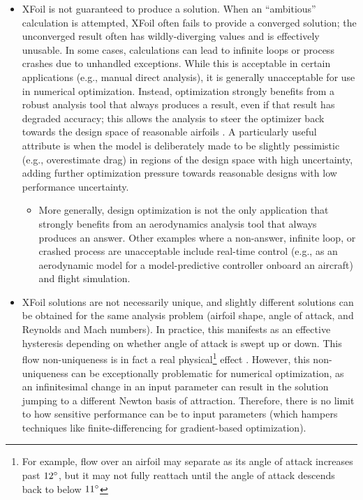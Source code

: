 \documentclass[conf]{new-aiaa}
\begin{document}
    \begin{itemize}
        \item XFoil is not guaranteed to produce a solution. When an ``ambitious'' calculation is attempted, XFoil often fails to provide a converged solution; the unconverged result often has wildly-diverging values and is effectively unusable. In some cases, calculations can lead to infinite loops or process crashes due to unhandled exceptions. While this is acceptable in certain applications (e.g., manual direct analysis), it is generally unacceptable for use in numerical optimization. Instead, optimization strongly benefits from a robust analysis tool that always produces a result, even if that result has degraded accuracy; this allows the analysis to steer the optimizer back towards the design space of reasonable airfoils \cite{he2019robust}. A particularly useful attribute is when the model is deliberately made to be slightly pessimistic (e.g., overestimate drag) in regions of the design space with high uncertainty, adding further optimization pressure towards reasonable designs with low performance uncertainty.
        \begin{itemize}
            \item More generally, design optimization is not the only application that strongly benefits from an aerodynamics analysis tool that always produces an answer. Other examples where a non-answer, infinite loop, or crashed process are unacceptable include real-time control (e.g., as an aerodynamic model for a model-predictive controller onboard an aircraft) and flight simulation.
        \end{itemize}
        \item XFoil solutions are not necessarily unique, and slightly different solutions can be obtained for the same analysis problem (airfoil shape, angle of attack, and Reynolds and Mach numbers). In practice, this manifests as an effective hysteresis depending on whether angle of attack is swept up or down. This flow non-uniqueness is in fact a real physical\footnote{For example, flow over an airfoil may separate as its angle of attack increases past $12\degree$, but it may not fully reattach until the angle of attack descends back to below $11\degree$} effect \cite{jameson_airfoils_1991, kuzmin2012non, he2019robust}. However, this non-uniqueness can be exceptionally problematic for numerical optimization, as an infinitesimal change in an input parameter can result in the solution jumping to a different Newton basis of attraction. Therefore, there is no limit to how sensitive performance can be to input parameters (which hampers techniques like finite-differencing for gradient-based optimization).

\end{itemize}
\end{document}
